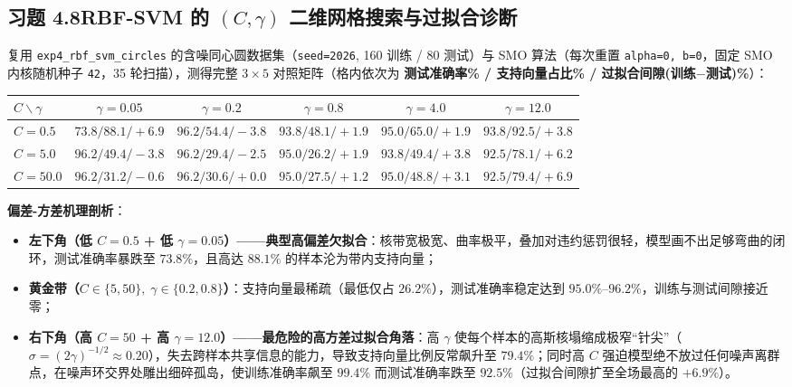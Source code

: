 \subsection*{习题 4.8\quad RBF-SVM 的 $(C, \gamma)$ 二维网格搜索与过拟合诊断}
复用 \texttt{exp4\_rbf\_svm\_circles} 的含噪同心圆数据集（\texttt{seed=2026}, 160 训练 / 80 测试）与 SMO 算法（每次重置 \texttt{alpha=0, b=0}，固定 SMO 内核随机种子 \texttt{42}，35 轮扫描），测得完整 $3\times 5$ 对照矩阵（格内依次为 \textbf{测试准确率\% / 支持向量占比\% / 过拟合间隙(训练$-$测试)\%}）：
\begin{center}\footnotesize
\begin{tabular}{@{}lccccc@{}}
  \toprule
  $C \backslash \gamma$ & $\gamma = 0.05$ & $\gamma = 0.2$ & $\gamma = 0.8$ & $\gamma = 4.0$ & $\gamma = 12.0$ \\
  \midrule
  $C = 0.5$ & $73.8 / 88.1 / +6.9$ & $96.2 / 54.4 / -3.8$ & $93.8 / 48.1 / +1.9$ & $95.0 / 65.0 / +1.9$ & $93.8 / 92.5 / +3.8$ \\
  $C = 5.0$ & $96.2 / 49.4 / -3.8$ & $96.2 / 29.4 / -2.5$ & $95.0 / 26.2 / +1.9$ & $93.8 / 49.4 / +3.8$ & $92.5 / 78.1 / +6.2$ \\
  $C = 50.0$ & $96.2 / 31.2 / -0.6$ & $96.2 / 30.6 / +0.0$ & $95.0 / 27.5 / +1.2$ & $95.0 / 48.8 / +3.1$ & $\mathbf{92.5 / 79.4 / +6.9}$ \\
  \bottomrule
\end{tabular}
\end{center}
\textbf{偏差-方差机理剖析}：
\begin{itemize}
  \item \textbf{左下角（低 $C=0.5$ + 低 $\gamma=0.05$）——典型高偏差欠拟合}：核带宽极宽、曲率极平，叠加对违约惩罚很轻，模型画不出足够弯曲的闭环，测试准确率暴跌至 $73.8\%$，且高达 $88.1\%$ 的样本沦为带内支持向量；
  \item \textbf{黄金带（$C \in \{5, 50\},\; \gamma \in \{0.2, 0.8\}$）}：支持向量最稀疏（最低仅占 $\mathbf{26.2\%}$），测试准确率稳定达到 $95.0\%$--$96.2\%$，训练与测试间隙接近零；
  \item \textbf{右下角（高 $C=50$ + 高 $\gamma=12.0$）——最危险的高方差过拟合角落}：高 $\gamma$ 使每个样本的高斯核塌缩成极窄“针尖”（$\sigma = (2\gamma)^{-1/2} \approx 0.20$），失去跨样本共享信息的能力，导致支持向量比例反常飙升至 $79.4\%$；同时高 $C$ 强迫模型绝不放过任何噪声离群点，在噪声环交界处雕出细碎孤岛，使训练准确率飙至 $99.4\%$ 而测试准确率跌至 $92.5\%$（过拟合间隙扩至全场最高的 $+6.9\%$）。
\end{itemize}

